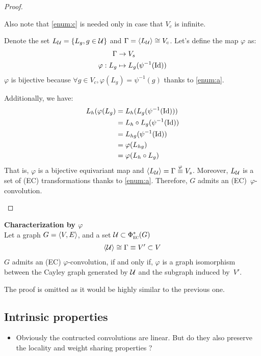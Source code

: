 \begin{proof}
\begin{enumerate}
Also note that \ref{enum:c} is needed only in case that $V_c$ is infinite.

Denote the set $L_{\mathcal{U}} = \{L_g, g \in \mathcal{U} \}$ and $\Gamma = \langle L_{\mathcal{U}} \rangle \cong V_c$. Let's define the map $\varphi$ as:
\begin{align*}
\Gamma & \rightarrow V_s\\
\varphi: L_g & \mapsto L_g(\psi^{-1}(\operatorname{Id}))
\end{align*}
$\varphi$ is bijective because $\forall g \in V_c, \varphi(L_g) = \psi^{-1}(g)$ thanks to \ref{enum:a}.

Additionally, we have:
\begin{align*}
L_h(\varphi(L_g) & = L_h(L_g(\psi^{-1}(\operatorname{Id})))\\
 & = L_h \circ L_g(\psi^{-1}(\operatorname{Id}))\\
 & = L_{hg}(\psi^{-1}(\operatorname{Id}))\\
 & = \varphi(L_{hg})\\
 & = \varphi(L_h \circ L_g)
\end{align*}
That is, $\varphi$ is a bijective equivariant map and $ \langle L_{\mathcal{U}} \rangle = \Gamma \overset{\varphi}{\equiv} V_s$. Moreover, $L_{\mathcal{U}}$ is a set of (EC) transformations thanks to \ref{enum:a}. Therefore, $G$ admits an (EC)~$\varphi$-convolution.
\end{enumerate}
\end{proof}

\begin{corrolary}\textbf{Characterization by $\varphi$}\\
Let a graph $G = \langle V, E \rangle$, and a set $\mathcal{U} \subset \Phi^*_{\operatorname{\textsc{ec}}}(G)$ \st
\begin{gather*}
\langle \mathcal{U} \rangle \cong \Gamma \equiv V' \subset V
\end{gather*}
$G$ admits an (EC) $\varphi$-convolution, if and only if, $\varphi$ is a graph isomorphism between the Cayley graph generated by $\mathcal{U}$ and the subgraph induced by~$V'$.
\label{cor:cayley}
\end{corrolary}
The proof is omitted as it would be highly similar to the previous one.

\subsection{Intrinsic properties}

\begin{itemize}
  \item Obviously the contructed convolutions are linear. But do they also preserve the locality and weight sharing properties ?
\end{itemize}

